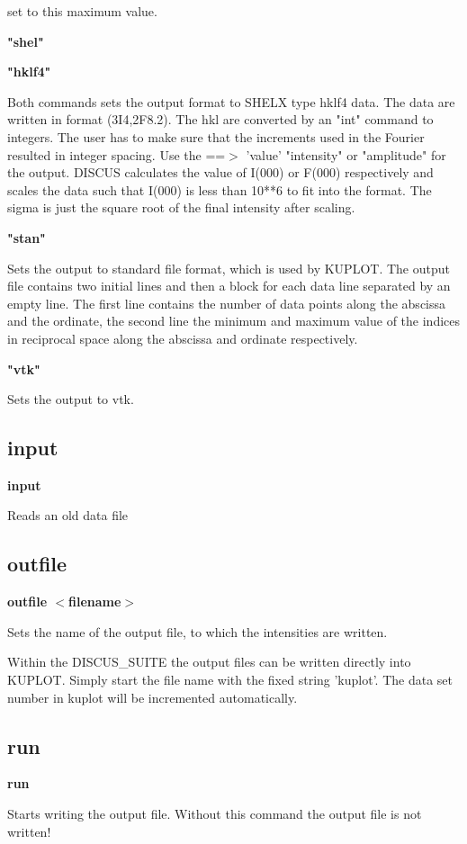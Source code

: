 set to this maximum value. 
\par
{\bf "shel" \par }
{\bf "hklf4" \par }
\vspace{3pt}
Both commands sets the output format to SHELX type hklf4 data. The 
data are written in format (3I4,2F8.2). 
The hkl are converted by an "int" command to integers. The 
user has to make sure that the increments used in the Fourier 
resulted in integer spacing. Use the ==$> $ 'value' "intensity" or 
"amplitude" for the output.  DISCUS calculates the value of I(000) or 
F(000) respectively and scales the data such that I(000) is less than 
10**6 to fit into the format. The sigma is just the square root of the 
final intensity after scaling. 
\par
{\bf "stan" \par }
\vspace{3pt}
Sets the output to standard file format, which is used by KUPLOT. 
The output file contains two initial lines and then a block for each 
data line separated by an empty line. The first line contains the 
number of data points along the abscissa and the ordinate, the 
second line the minimum and maximum value of the indices in reciprocal 
space along the abscissa and ordinate respectively. 
{\bf "vtk" \par }
\vspace{3pt}
Sets the output to vtk. 
\subsection*{input}
{\bf input \par }
\par
\vspace{3pt}
Reads an old data file 
\subsection*{outfile}
{\bf outfile $ <$filename$> $ \par }
\par
\vspace{3pt}
Sets the name of the output file, to which the intensities are written. 
\par
Within the DISCUS\_SUITE the output files can be written directly into 
KUPLOT. Simply start the file name with the fixed string 'kuplot'. 
The data set number in kuplot will be incremented automatically. 
\subsection*{run}
{\bf run \par }
\par
\vspace{3pt}
Starts writing the output file. Without this command the output file 
is not written! 

